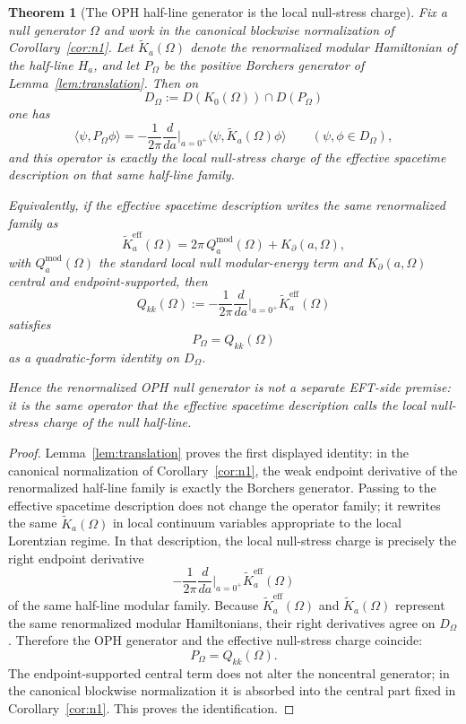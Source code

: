 \documentclass[11pt]{article}
\newtheorem{theorem}{Theorem}[section]
\begin{document}
\begin{theorem}[The OPH half-line generator is the local null-stress charge]\label{thm:stress}
Fix a null generator \(\Omega\) and work in the canonical blockwise normalization of Corollary~\ref{cor:n1}. Let \(\widetilde K_a(\Omega)\) denote the renormalized modular Hamiltonian of the half-line \(H_a\), and let \(P_\Omega\) be the positive Borchers generator of Lemma~\ref{lem:translation}. Then on
\[
D_\Omega:=D(K_0(\Omega))\cap D(P_\Omega)
\]
one has
\[
\langle\psi,P_\Omega\phi\rangle
=
-\frac{1}{2\pi}\frac{d}{da}\Big|_{a=0^+}
\langle\psi,\widetilde K_a(\Omega)\phi\rangle
\qquad (\psi,\phi\in D_\Omega),
\]
and this operator is exactly the local null-stress charge of the effective spacetime description on that same half-line family.

Equivalently, if the effective spacetime description writes the same renormalized family as
\[
\widetilde K^{\mathrm{eff}}_a(\Omega)
=
2\pi\,Q^{\mathrm{mod}}_a(\Omega)+K_{\partial}(a,\Omega),
\]
with \(Q^{\mathrm{mod}}_a(\Omega)\) the standard local null modular-energy term and \(K_{\partial}(a,\Omega)\) central and endpoint-supported, then
\[
Q_{kk}(\Omega)
:=
-\frac{1}{2\pi}\frac{d}{da}\Big|_{a=0^+}\widetilde K^{\mathrm{eff}}_a(\Omega)
\]
satisfies
\[
P_\Omega = Q_{kk}(\Omega)
\]
as a quadratic-form identity on \(D_\Omega\).

Hence the renormalized OPH null generator is not a separate EFT-side premise: it is the same operator that the effective spacetime description calls the local null-stress charge of the null half-line.
\end{theorem}

\begin{proof}
Lemma~\ref{lem:translation} proves the first displayed identity: in the canonical normalization of Corollary~\ref{cor:n1}, the weak endpoint derivative of the renormalized half-line family is exactly the Borchers generator. Passing to the effective spacetime description does not change the operator family; it rewrites the same \(\widetilde K_a(\Omega)\) in local continuum variables appropriate to the local Lorentzian regime. In that description, the local null-stress charge is precisely the right endpoint derivative
\[
-\frac{1}{2\pi}\frac{d}{da}\Big|_{a=0^+}\widetilde K^{\mathrm{eff}}_a(\Omega)
\]
of the same half-line modular family. Because \(\widetilde K^{\mathrm{eff}}_a(\Omega)\) and \(\widetilde K_a(\Omega)\) represent the same renormalized modular Hamiltonians, their right derivatives agree on \(D_\Omega\). Therefore the OPH generator and the effective null-stress charge coincide:
\[
P_\Omega = Q_{kk}(\Omega).
\]
The endpoint-supported central term does not alter the noncentral generator; in the canonical blockwise normalization it is absorbed into the central part fixed in Corollary~\ref{cor:n1}. This proves the identification.
\end{proof}
\end{document}
